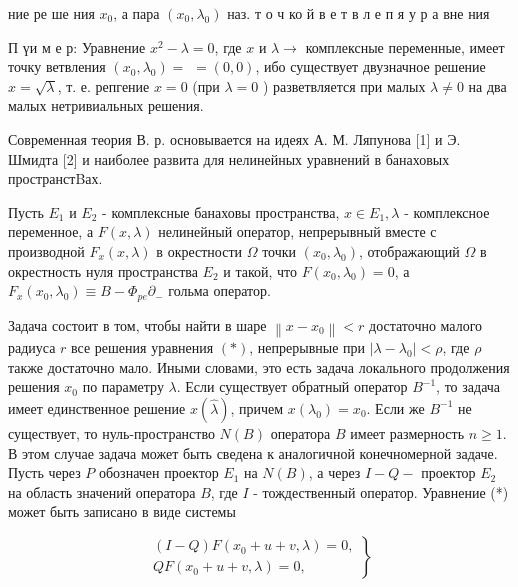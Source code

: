 \documentclass[10pt]{article}
\begin{document}
ние ре ше ния $x_{0}$, а пара $\left(x_{0}, \lambda_{0}\right)$ наз. т о ч ко й в е т в л е п я у р а вне ния



П үи м е р: Уравнение $x^{2}-\lambda=0$, где $x$ и $\lambda \rightarrow$ комплексные переменные, имеет точку ветвления $\left(x_{0}, \lambda_{0}\right)=$ $=(0,0)$, ибо существует двузначное решение $x=\sqrt{\lambda}$, т. е. репгение $x=0$ (при $\lambda=0$ ) разветвляется при малых $\lambda \neq 0$ на два малых нетривиальных решения.



Современная теория В. р. основывается на идеях А. М. Ляпунова [1] и Э. Шмидта [2] и наиболее развита для нелинейных уравнений в банаховых пространстBах.



Пусть $E_{1}$ и $E_{2}$ - комплексные банаховы пространства, $x \in E_{1}, \lambda$ - комплексное переменное, а $F(x, \lambda)$ нелинейный оператор, непрерывный вместе с производной $F_{x}(x, \lambda)$ в окрестности $\Omega$ точки $\left(x_{0}, \lambda_{0}\right)$, отображающий $\Omega$ в окрестность нуля пространства $E_{2}$ и такой, что $F\left(x_{0}, \lambda_{0}\right)=0$, а $F_{x}\left(x_{0}, \lambda_{0}\right) \equiv B-\Phi_{p e} \partial_{-}$ гольма оператор.



Задача состоит в том, чтобы найти в шаре $\left\|x-x_{0}\right\|<r$ достаточно малого радиуса $r$ все решения уравнения $(*)$, непрерывные при $\left|\lambda-\lambda_{0}\right|<\rho$, где $\rho$ также достаточно мало. Иными словами, это есть задача локального продолжения решения $x_{0}$ по параметру $\lambda$. Если существует обратный оператор $B^{-1}$, то задача имеет единственное решение $x(\hat{\lambda})$, причем $x\left(\lambda_{0}\right)=x_{0}$. Если же $B^{-1}$ не существует, то нуль-пространство $N(B)$ оператора $B$ имеет размерность $n \geqslant 1$. В этом случае задача может быть сведена к аналогичной конечномерной задаче. Пусть через $P$ обозначен проектор $E_{1}$ на $N(B)$, а через $I-Q-$ проектор $E_{2}$ на область значений оператора $B$, где $I$ - тождественный оператор. Уравнение (*) может быть записано в виде системы



\[

\left.\begin{array}{l}

(I-Q) F\left(x_{0}+u+v, \lambda\right)=0, \\

Q F\left(x_{0}+u+v, \lambda\right)=0,

\end{array}\right\}

\]
\end{document}
